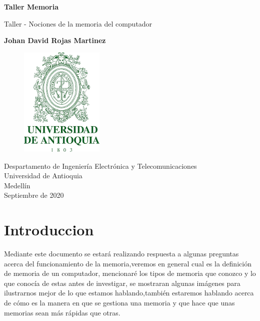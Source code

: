 \documentclass{article}
\begin{document}
\begin{titlepage}
    \begin{center}
        \vspace*{1cm}
            
        \Huge
        \textbf{Taller Memoria}
            
        \vspace{0.5cm}
        \LARGE
        Taller - Nociones de la memoria del computador
            
        \vspace{1.5cm}
            
        \textbf{Johan David Rojas Martinez}
            
        \vfill
            
        \vspace{0.8cm}
       
        \Large
\begin{figure}[h]
\includegraphics[width=4cm]{logoudea.png}
\centering
\end{figure}

        \vfill
        Despartamento de Ingeniería Electrónica y Telecomunicaciones\\
        Universidad de Antioquia\\
        Medellín\\
        Septiembre de 2020
                 
    \end{center}
\end{titlepage}

\tableofcontents

\section{Introduccion}
\noindent
Mediante este documento se estará realizando respuesta a algunas preguntas acerca del funcionamiento de la memoria,veremos en general cual es la definición de memoria de un computador, mencionaré los tipos de memoria que conozco y lo que conocía de estas antes de investigar, se mostraran algunas imágenes para ilustrarnos mejor de lo que estamos hablando,también estaremos hablando acerca de cómo es la manera en que se gestiona una memoria y que hace que unas memorias sean más rápidas que otras. 
\end{document}
